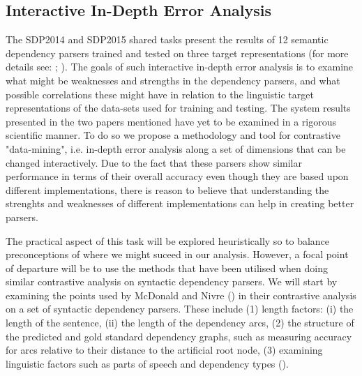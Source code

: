 \documentclass[10pt]{article}
\begin{document}
\subsection{Interactive In-Depth Error Analysis}
The SDP2014 and SDP2015 shared tasks present the results of 12 semantic dependency parsers trained and tested on three target representations (for more details see: \cite{semeval2014}; \cite{semeval2015}). The goals of such interactive in-depth error analysis is to examine what might be weaknesses and strengths in the dependency parsers, and what possible correlations these might have in relation to the linguistic target representations of the data-sets used for training and testing. The system results presented in the two papers mentioned have yet to be examined in a rigorous scientific manner. To do so we propose a methodology and tool for contrastive "data-mining", i.e. in-depth error analysis along a set of dimensions that can be changed interactively. Due to the fact that these parsers show similar performance in terms of their overall accuracy even though they are based upon different implementations, there is reason to believe that understanding the strenghts and weaknesses of different implementations can help in creating better parsers. 

The practical aspect of this task will be explored heuristically so to balance preconceptions of where we might suceed in our analysis. However, a focal point of departure will be to use the methods that have been utilised when doing similar contrastive analysis on syntactic dependency parsers. We will start by examining the points used by McDonald and Nivre (\cite{mcdonald-nivre-error-analysis}) in their contrastive analysis on a set of syntactic dependency parsers. These include (1) length factors: (i) the length of the sentence, (ii) the length of the dependency arcs, (2) the structure of the predicted and gold standard dependency graphs, such as measuring accuracy for arcs relative to their distance to the artificial root node, (3) examining linguistic factors such as parts of speech and dependency types (\cite{mcdonald-nivre-error-analysis}).
\end{document}
